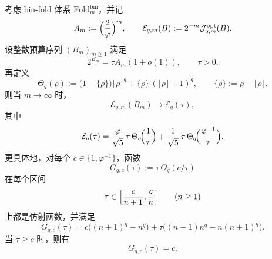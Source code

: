 \begin{theorem}\label{thm:conclusion-binfold-critical-budget-renyi-energy}
考虑 bin-fold 体系 \(\mathrm{Fold}_m^{\mathrm{bin}}\)，并记
\[
A_m:=\Bigl(\frac{2}{\varphi}\Bigr)^m,
\qquad
\mathcal E_{q,m}(B):=2^{-m}\mathcal J_{q,m}^{\mathrm{opt}}(B).
\]
设整数预算序列 \((B_m)_{m\ge 1}\) 满足
\[
2^{B_m}=\tau A_m(1+o(1)),
\qquad
\tau>0.
\]
再定义
\[
\Theta_q(\rho):=
\bigl(1-\{\rho\}\bigr)\lfloor\rho\rfloor^q
+
\{\rho\}\,(\lfloor\rho\rfloor+1)^q,
\qquad
\{\rho\}:=\rho-\lfloor\rho\rfloor.
\]
则当 \(m\to\infty\) 时，
\[
\mathcal E_{q,m}(B_m)\longrightarrow \mathcal E_q(\tau),
\]
其中
\[
\mathcal E_q(\tau)
=
\frac{\varphi}{\sqrt5}\,\tau\,\Theta_q\!\Bigl(\frac1\tau\Bigr)
+
\frac1{\sqrt5}\,\tau\,\Theta_q\!\Bigl(\frac{\varphi^{-1}}{\tau}\Bigr).
\]
更具体地，对每个 \(c\in\{1,\varphi^{-1}\}\)，函数
\[
G_{q,c}(\tau):=\tau\,\Theta_q(c/\tau)
\]
在每个区间
\[
\tau\in\Bigl[\frac{c}{n+1},\frac{c}{n}\Bigr]
\qquad (n\ge 1)
\]
上都是仿射函数，并满足
\[
G_{q,c}(\tau)
=
c\bigl((n+1)^q-n^q\bigr)
+
\tau\bigl((n+1)n^q-n(n+1)^q\bigr).
\]
当 \(\tau\ge c\) 时，则有
\[
G_{q,c}(\tau)=c.
\]
\end{theorem}
